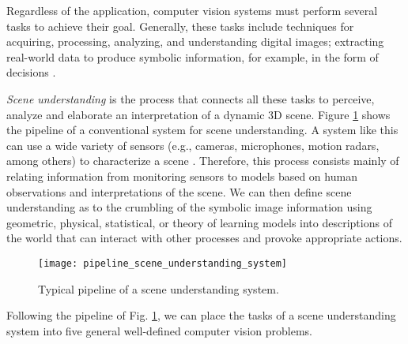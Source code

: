 Regardless of the application, computer vision systems must perform several tasks to achieve their goal. Generally, these tasks include techniques for acquiring, processing, analyzing, and understanding digital images; extracting real-world data to produce symbolic information, for example, in the form of decisions \citep{Wiley.Lucas:IJAI:2018}.

\textit{Scene understanding} is the process that connects all these tasks to perceive, analyze and elaborate an interpretation of a dynamic 3D scene. Figure \ref{fig:scene_understanding_systme_pipeline} shows the pipeline of a conventional system for scene understanding. A system like this can use a wide variety of sensors (e.g., cameras, microphones, motion radars, among others) to characterize a scene \citep{Bremond:HDR:2007}. Therefore, this process consists mainly of relating information from monitoring sensors to models based on human observations and interpretations of the scene. We can then define scene understanding as to the crumbling of the symbolic image information using geometric, physical, statistical, or theory of learning models into descriptions of the world that can interact with other processes and provoke appropriate actions.   

\begin{figure}[!ht]
    \centering
    \texttt{[image: pipeline\_scene\_understanding\_system]}        
    \caption{Typical pipeline of a scene understanding system.}\label{fig:scene_understanding_systme_pipeline}
\end{figure}

Following the pipeline of Fig. \ref{fig:scene_understanding_systme_pipeline}, we can place the tasks of a scene understanding system into five general well-defined computer vision problems.

